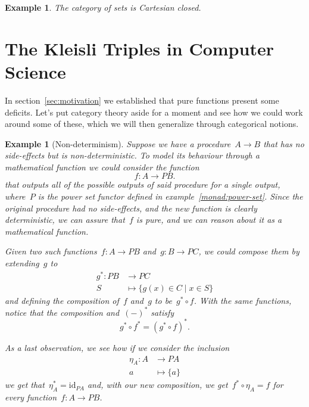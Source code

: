 \documentclass[a4paper]{article}
\theoremstyle{plain}
\newtheorem{example}[theorem]{Example}
\theoremstyle{definition}
\newcommand{\id}{\mathrm{id}}
\begin{document}
\begin{example}
    The category of sets is Cartesian closed.
\end{example}

\section{The Kleisli Triples in Computer Science}
In section~\ref{sec:motivation} we established that pure functions present some
deficits. Let's put category theory aside for a moment and see how we could work
around some of these, which we will then generalize through categorical notions.
\begin{example}[Non-determinism]
    Suppose we have a procedure~\(A\longrightarrow B\) that has no side-effects
    but is non-deterministic. To model its behaviour through a mathematical
    function we could consider the function
    \[
        f:A\longrightarrow PB.
    \]
    that outputs all of the possible outputs of said procedure for a single
    output, where~\(P\) is the power set functor defined in
    example~\ref{monad:power-set}. Since the original procedure had no
    side-effects, and the new function is clearly deterministic, we can assure
    that~\(f\) is pure, and we can reason about it as a mathematical function.

    Given two such functions~\(f:A\longrightarrow PB\)
    and~\(g:B\longrightarrow PC\), we could compose them by extending~\(g\) to
    \begin{align*}
        g^{\ast}:PB&\longrightarrow PC \\
        S&\longmapsto\{g(x)\in C \mid x\in S\}
    \end{align*}
    and defining the composition of~\(f\) and~\(g\) to be~\(g^{\ast} \circ f\).
    With the same functions, notice that the composition and~\((-)^{\ast}\)
    satisfy
    \[
        g^{\ast}\circ f^{\ast}
        = (g^{\ast} \circ f)^{\ast}.
    \]

    As a last observation, we see how if we consider the inclusion
    \begin{align*}
        \eta_{A}:A&\longrightarrow PA \\
        a&\longmapsto\{a\}
    \end{align*}
    we get that~\(\eta_{A}^{\ast}=\id_{PA}\) and, with our new
    composition, we get~\(f^{\ast}\circ\eta_{A}=f\) for every
    function~\(f:A\longrightarrow PB\).
\end{example}
\end{document}
